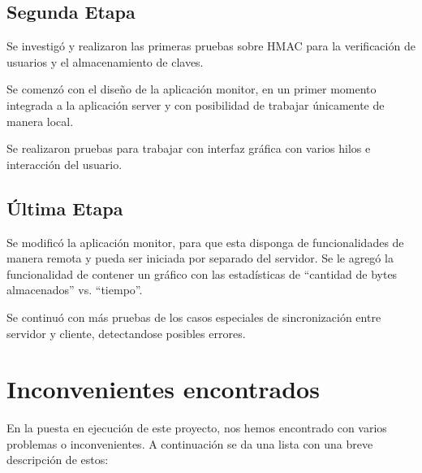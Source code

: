 \documentclass{article}
\begin{document}
\subsection{Segunda Etapa}
\smallskip

	Se investigó y realizaron las primeras pruebas sobre HMAC para la verificación de usuarios y el almacenamiento de claves.
	\par
	Se comenzó con el diseño de la aplicación monitor, en un primer momento integrada a la aplicación server y con posibilidad de trabajar únicamente de manera local.
	\par
	Se realizaron pruebas para trabajar con interfaz gráfica con varios hilos e interacción del usuario.

\subsection{Última Etapa}
\smallskip

	Se modificó la aplicación monitor, para que esta disponga de funcionalidades de manera remota y pueda ser iniciada por separado del servidor. Se le agregó la funcionalidad de contener un gráfico con las estadísticas de “cantidad de bytes almacenados” vs. “tiempo”.
	\par
	Se continuó con más pruebas de los casos especiales de sincronización entre servidor y cliente, detectandose posibles errores. 

\bigskip




\section{Inconvenientes encontrados}

	En la puesta en ejecución de este proyecto, nos hemos encontrado con varios problemas o inconvenientes. A continuación se da una lista con una breve descripción de estos:
\end{document}
